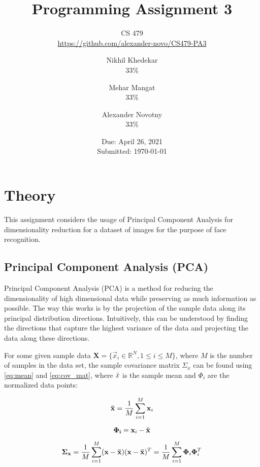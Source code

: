 \documentclass[headings=optiontoheadandtoc,listof=totoc,parskip=full]{scrartcl}
\title{Programming Assignment 3}
\subtitle{CS 479\\\url{https://github.com/alexander-novo/CS479-PA3}}
\author{Nikhil Khedekar\\33\%\\\Cref{sec:part-3} \and Mehar Mangat\\33\%\\\Cref{sec:part-3} \and Alexander Novotny\\33\%\\\Cref{sec:part-1}}
\date{Due: April 26, 2021 \\ Submitted: \today}
\def \reals {\mathbb{R}}
\begin{document}
\maketitle
\tableofcontents
{}

\newpage
{}


\section{Theory}

This assignment considers the usage of Principal Component Analysis for dimensionality reduction for a dataset of images for the purpose of face recognition. 

\subsection{Principal Component Analysis (PCA)}
Principal Component Analysis (PCA) is a method for reducing the dimensionality of high dimensional data while preserving as much information as possible. The way this works is by the projection of the sample data along its principal distribution directions. Intuitively, this can be understood by finding the directions that capture the highest variance of the data and projecting the data along these directions. 


For some given sample data $\mathbf{X} = \{\vec x_i \in \reals^N, 1 \leq i \leq M\}$, where $M$ is the number of samples in the data set, the sample covariance matrix $\Sigma_x$ can be found using \cref{eq:mean} and \cref{eq:cov_mat}, where $\Bar{x}$ is the sample mean and $\Phi_i$ are the normalized data points:

\begin{equation} \label{eq:mean}
    \mathbf{\Bar{x}} = \frac{1}{M}\sum_{i = 1}^{M}\mathbf{x}_i
\end{equation}

\begin{equation}
    \mathbf{\Phi_i} = \mathbf{x}_i - \mathbf{\Bar{x}}
\end{equation}

\begin{equation} \label{eq:cov_mat}
    \mathbf{\Sigma_x} = \frac{1}{M}\sum_{i = 1}^M(\mathbf{x} - \mathbf{\Bar{x}})(\mathbf{x} - \mathbf{\Bar{x}})^T = \frac{1}{M}\sum_{i = 1}^{M}\mathbf{\Phi}_i\mathbf{\Phi}_i^T 
\end{equation}
\end{document}
